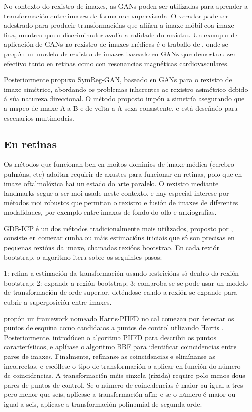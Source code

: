 No contexto do rexistro de imaxes, as GANs poden ser utilizadas para aprender a transformación entre imaxes de forma non supervisada. O xerador pode ser adestrado para producir transformacións que aliñen a imaxe móbil coa imaxe fixa, mentres que o discriminador avalía a calidade do rexistro.
Un exemplo de aplicación de GANs no rexistro de imaxes médicas é o traballo de \cite{mahapatra2019ganbasedmedicalimage}, onde se propón un modelo de rexistro de imaxes baseado en GANs que demostrou ser efectivo tanto en retinas como con resonancias magnéticas cardiovasculares.

Posteriormente \cite{gan2} propuxo SymReg-GAN, baseado en GANs para o rexistro de imaxe simétrico, abordando os problemas inherentes ao rexistro asimétrico debido á súa natureza direccional.
 O método proposto impón a simetría asegurando que a mapeo de imaxe A a B e de volta a A sexa consistente, e está deseñado para escenarios multimodais.

\subsection{En retinas}
\label{subsec:Retinas}

Os métodos que funcionan ben en moitos dominios de imaxe médica (cerebro, pulmóns, etc) 
adoitan requirir de axustes para funcionar en retinas, polo que en imaxe oftalmolóxica hai un estado do arte paralelo.
O rexistro mediante landmarks segue a ser moi usado neste contexto, e hay especial interese por métodos moi robustos que permitan
 o rexistro e fusión de imaxes de diferentes modalidades, por exemplo entre imaxes de fondo do ollo e anxiografías.

\gls{GDB-ICP} é un dos métodos tradicionalmente mais utilizados, proposto por \cite{GDB-ICP}, consiste en
 comezar cunha ou máis estimacións iniciais que só son precisas en pequenas rexións da imaxe, chamadas rexións bootstrap. 
 En cada rexión bootstrap, o algoritmo itera sobre os seguintes pasos: 
 
1: refina a estimación da transformación usando restricións só dentro da rexión bootstrap; 
2: expande a rexión bootstrap;
3: comproba se se pode usar un modelo de transformación de orde superior, deténdose cando a rexión se expande para cubrir a superposición entre imaxes.


\cite{piifd} propón un framework nomeado Harris-PIIFD no cal comezan por detectar os puntos de esquina como candidatos a puntos de control utlizando Harris \cite{Harris1988ACC}.
Posteriormente, introdúcen o algoritmo \gls{PIIFD} para describir os puntos característicos, e aplícase o algoritmo \gls{BBF} \cite{BBF} para identificar coincidencias entre pares de imaxes.
Finalmente, refínanse as coincidencias e elimínanse as incorrectas, e escóllese o tipo de transformación a aplicar en función do número de coincidencias.
A transformación máis sinxela (ríxida) require polo menos dous pares de puntos de control. Se o número de coincidencias é maior ou igual a tres pero menor que seis, aplícase a transformación afín; e se o número é maior ou igual a seis, aplícase a transformación polinomial de segunda orde.

